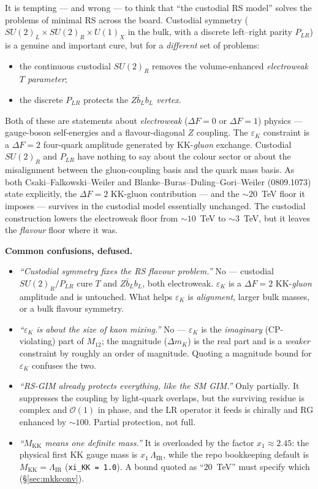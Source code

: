 \documentclass[11pt]{article}
\newenvironment{callout}[1]{%
  \par\medskip\begin{shaded}\noindent\textbf{#1}\par\smallskip}{\end{shaded}\medskip}
\newcommand{\MKK}{M_{\mathrm{KK}}}
\newcommand{\LIR}{\Lambda_{\mathrm{IR}}}
\newcommand{\epsK}{\varepsilon_K}
\newcommand{\Mtwelve}{M_{12}}
\newcommand{\dmk}{\Delta m_K}
\newcommand{\code}[1]{\texttt{#1}}
\theoremstyle{definition}
\begin{document}
It is tempting --- and wrong --- to think that ``the custodial RS model'' solves
the problems of minimal RS across the board. Custodial symmetry
($SU(2)_L\times SU(2)_R\times U(1)_X$ in the bulk, with a discrete left--right
parity $P_{LR}$) is a genuine and important cure, but for a \emph{different} set
of problems:
\begin{itemize}[leftmargin=1.4em]
\item the continuous custodial $SU(2)_R$ removes the volume-enhanced
\emph{electroweak $T$ parameter};
\item the discrete $P_{LR}$ protects the \emph{$Z\bar b_L b_L$ vertex}.
\end{itemize}
Both of these are statements about \emph{electroweak} ($\Delta F=0$ or $\Delta
F=1$) physics --- gauge-boson self-energies and a flavour-diagonal $Z$ coupling.
The $\epsK$ constraint is a \emph{$\Delta F=2$} four-quark amplitude generated by
KK-\emph{gluon} exchange. Custodial $SU(2)_R$ and $P_{LR}$ have nothing to say
about the colour sector or about the misalignment between the gluon-coupling basis
and the quark mass basis. As both Csaki--Falkowski--Weiler and
Blanke--Buras--Duling--Gori--Weiler (0809.1073) state explicitly, the $\Delta F=2$
KK-gluon contribution --- and the $\sim20$~TeV floor it imposes --- survives in the
custodial model essentially unchanged. The custodial construction lowers the
electroweak floor from $\sim10$~TeV to $\sim3$~TeV, but it leaves the
\emph{flavour} floor where it was.

\begin{callout}{Common confusions, defused.}
\begin{itemize}[leftmargin=1.2em,nosep]
\item[\textbf{A.}] \emph{``Custodial symmetry fixes the RS flavour problem.''} No
--- custodial $SU(2)_R/P_{LR}$ cure $T$ and $Z\bar b_L b_L$, both electroweak.
$\epsK$ is a $\Delta F=2$ KK-\emph{gluon} amplitude and is untouched. What helps
$\epsK$ is \emph{alignment}, larger bulk masses, or a bulk flavour symmetry.
\item[\textbf{B.}] \emph{``$\epsK$ is about the size of kaon mixing.''} No ---
$\epsK$ is the \emph{imaginary} (CP-violating) part of $\Mtwelve$; the magnitude
($\dmk$) is the real part and is a \emph{weaker} constraint by roughly an order of
magnitude. Quoting a magnitude bound for $\epsK$ confuses the two.
\item[\textbf{C.}] \emph{``RS-GIM already protects everything, like the SM GIM.''}
Only partially. It suppresses the coupling by light-quark overlaps, but the
surviving residue is complex and $\mathcal{O}(1)$ in phase, and the LR operator
it feeds is chirally and RG enhanced by $\sim100$. Partial protection, not full.
\item[\textbf{D.}] \emph{``$\MKK$ means one definite mass.''} It is overloaded by
the factor $x_1\approx2.45$: the physical first KK gauge mass is $x_1\,\LIR$,
while the repo bookkeeping default is $\MKK=\LIR$ (\code{xi\_KK = 1.0}). A bound
quoted as ``$20$~TeV'' must specify which (\S\ref{sec:mkkconv}).
\end{itemize}
\end{callout}
\end{document}
